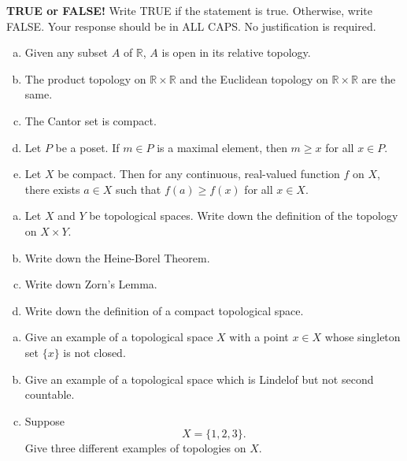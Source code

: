 \documentclass[11pt]{exam}
\theoremstyle{definition}
\begin{document}
\begin{questions}

\addpoints

\question[10]\mbox{}
\textbf{TRUE or FALSE!}  Write  TRUE if the statement is true.  Otherwise, write FALSE.  Your response should be in ALL CAPS.  No justification is required.
\begin{enumerate}[(a)]
\item  Given any subset $A$ of $\mathbb{R}$, $A$ is open in its relative topology.
\vspace{1.2in}
\item  The product topology on $\mathbb R\times\mathbb R$ and the Euclidean topology on $\mathbb R\times \mathbb R$ are the same.
\vspace{1.2in}
\item  The Cantor set is compact.
\vspace{1.2in}
\item  Let $P$ be a poset.  If $m\in P$ is a maximal element, then $m \geq x$ for all $x\in P$.
\vspace{1.2in}
\item  Let $X$ be compact.  Then for any continuous, real-valued function $f$ on $X$, there exists $a\in X$ such that $f(a) \geq f(x)$ for all $x\in X$.
\end{enumerate}


\newpage
\question[10]\mbox{} %
\begin{enumerate}[(a)]
\item  Let $X$ and $Y$ be topological spaces.  Write down the definition of the topology on $X\times Y$.
\vspace{2in}
\item  Write down the Heine-Borel Theorem.
\vspace{2in}
\item  Write down Zorn's Lemma.
\vspace{2in}
\item  Write down the definition of a compact topological space.
\end{enumerate}

\newpage
\question[10]\mbox{} 
\begin{enumerate}[(a)]
\item  Give an example of a topological space $X$ with a point $x\in X$ whose singleton set $\{x\}$ is not closed.
\vspace{1.5in}
\item  Give an example of a topological space which is Lindelof but not second countable.
\vspace{1.5in}
\item  Suppose $$X = \{1,2,3\}.$$  Give three different examples of topologies on $X$.
\end{enumerate}


\end{questions}
\end{document}
